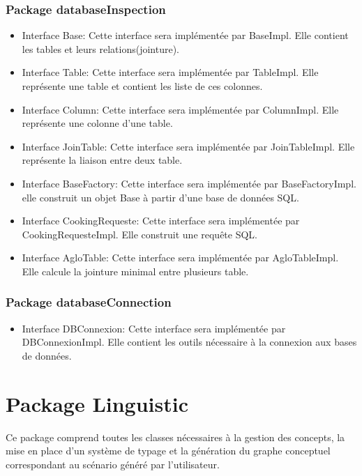 \documentclass[12pt]{report}
\begin{document}
\subsubsection*{Package databaseInspection}
\begin{itemize}
\item Interface Base: Cette interface sera implémentée par BaseImpl. Elle contient les tables et leurs relations(jointure).
\item Interface Table: Cette interface sera implémentée par TableImpl. Elle représente une table et contient les liste de ces colonnes.
\item Interface Column: Cette interface sera implémentée par ColumnImpl. Elle représente une colonne d'une table.
\item Interface JoinTable: Cette interface sera implémentée par JoinTableImpl. Elle représente la liaison entre deux table.
\item Interface BaseFactory: Cette interface sera implémentée par BaseFactoryImpl. elle construit un objet Base à partir d'une base de données SQL.
\item Interface CookingRequeste: Cette interface sera implémentée par CookingRequesteImpl. Elle construit une requête SQL.
\item Interface AgloTable: Cette interface sera implémentée par AgloTableImpl. Elle calcule la jointure minimal entre plusieurs table.
\end{itemize}

\subsubsection*{Package databaseConnection}
\begin{itemize}
\item Interface DBConnexion: Cette interface sera implémentée par DBConnexionImpl. Elle contient les outils nécessaire à la connexion aux bases de données.
\end{itemize}



\section{Package Linguistic}

Ce package comprend toutes les classes nécessaires à la gestion des concepts, la mise en place d'un système de typage et la génération du graphe conceptuel correspondant au scénario généré par l'utilisateur.
\end{document}
